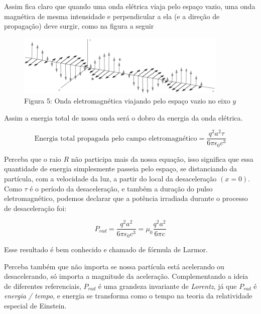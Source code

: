 \documentclass[12pt, letterpaper]{article}
\begin{document}
    Assim fica claro que quando uma onda elétrica viaja pelo espaço vazio, uma onda magnética de mesma intensidade e perpendicular a ela (e a direção de propagação) deve surgir, como na figura a seguir

    \begin{figure}[h]
        \centering
        \includegraphics[width=0.9\textwidth]{wave}
        \\ Figura 5: Onda eletromagnética viajando pelo espaço vazio no eixo $y$
    \end{figure}

    Assim a energia total de nossa onda será o dobro da energia da onda elétrica.

    \begin{equation} \label{eq7}
        \textrm{Energia total propagada pelo campo eletromagnético} =\frac{q^2a^2\tau}{6\pi\epsilon_0c^3}
    \end{equation}

    Perceba que o raio $R$ não participa mais da nossa equação, isso significa que essa quantidade de energia simplesmente passeia pelo espaço, se distanciando da partícula, com a velocidade da luz, a partir do local da desaceleração $(x = 0)$. Como $\tau$ é o período da desaceleração, e também a duração do pulso eletromagnético, podemos declarar que a potência irradiada durante o processo de desaceleração foi:

    \begin{equation} \label{eqMaster}
        P_{rad} = \frac{q^2a^2}{6\pi\epsilon_0c^3} = \mu_0\frac{q^2a^2}{6\pi c}
    \end{equation}

    Esse resultado é bem conhecido e chamado de fórmula de Larmor.

    Perceba também que não importa se nossa partícula está acelerando ou desacelerando, só importa a magnitude da aceleração. Complementando a ideia de diferentes referenciais, $P_{rad}$ é uma grandeza invariante de \textit{Lorentz}, já que $P_{rad}$ é \textit{energia / tempo}, e energia se transforma como o tempo na teoria da relatividade especial de Einstein.
\end{document}
